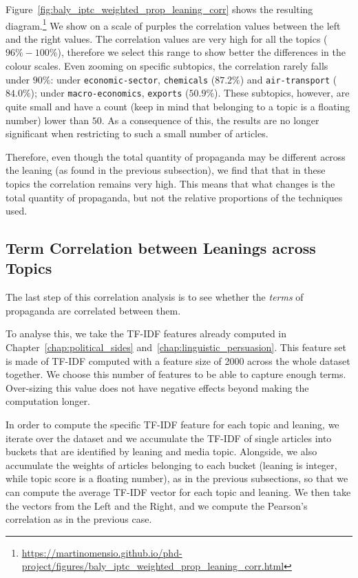 Figure~\ref{fig:baly_iptc_weighted_prop_leaning_corr} shows the resulting diagram.\footnote{\url{https://martinomensio.github.io/phd-project/figures/baly_iptc_weighted_prop_leaning_corr.html}}
We show on a scale of purples the correlation values between the left and the right values.
The correlation values are very high for all the topics ($96\% - 100\%$), therefore we select this range to show better the differences in the colour scales.
Even zooming on specific subtopics, the correlation rarely falls under $90\%$: under \texttt{economic-sector}, \texttt{chemicals} ($87.2\%$) and \texttt{air-transport} ($84.0\%$); under \texttt{macro-economics}, \texttt{exports} ($50.9\%$). 
These subtopics, however, are quite small and have a count (keep in mind that belonging to a topic is a floating number) lower than $50$. As a consequence of this, the results are no longer significant when restricting to such a small number of articles.

Therefore, even though the total quantity of propaganda may be different across the leaning (as found in the previous subsection), we find that that in these topics the correlation remains very high.
This means that what changes is the total quantity of propaganda, but not the relative proportions of the techniques used.

\subsection{\statusgreen Term Correlation between Leanings across Topics}
\label{ssec:topic_propaganda_leaning_terms}

The last step of this correlation analysis is to see whether the \emph{terms} of propaganda are correlated between them.

To analyse this, we take the TF-IDF features already computed in Chapter~\ref{chap:political_sides} and~\ref{chap:linguistic_persuasion}.
This feature set is made of TF-IDF computed with a feature size of 2000
across the whole dataset together.
We choose this number of features to be able to capture enough terms. Over-sizing this value does not have negative effects beyond making the computation longer.

In order to compute the specific TF-IDF feature for each topic and leaning, we iterate over the dataset and we accumulate the TF-IDF of single articles into buckets that are identified by leaning and media topic.
Alongside, we also accumulate the weights of articles belonging to each bucket (leaning is integer, while topic score is a floating number), as in the previous subsections, so that we can compute the average TF-IDF vector for each topic and leaning.
We then take the vectors from the Left and the Right, and we compute the Pearson's correlation as in the previous case.

